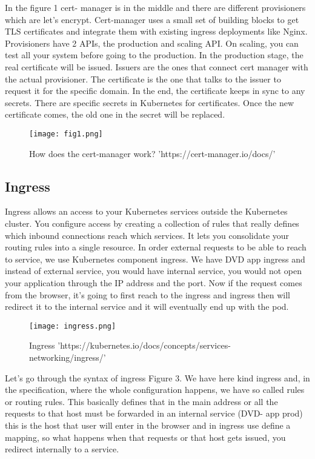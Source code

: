 \documentclass{article}
\begin{document}
In the figure 1  cert- manager is in the middle and there are different provisioners which are let’s encrypt. Cert-manager uses a small set of building blocks to get TLS certificates and integrate them with existing ingress deployments like Nginx. Provisioners have 2 APIs, the production and scaling API. On scaling, you can test all your system before going to the production.  In the production stage, the real certificate will be issued. Issuers are the ones that connect cert manager with the actual provisioner. The certificate is the one that talks to the issuer to request it for the specific domain. In the end, the certificate keeps in sync to any secrets. There are specific secrets in Kubernetes for certificates. Once the new certificate comes, the old one in the secret will be replaced.

\begin{figure}
    \centering
    \texttt{[image: fig1.png]}
    \caption{How does the cert-manager work? 'https://cert-manager.io/docs/'}
    \label{fig:my_label}
\end{figure}


\subsection{Ingress}


Ingress allows an access to your Kubernetes services outside the Kubernetes cluster. You configure access by creating a collection of rules that really defines which inbound connections reach which services. It lets you consolidate your routing rules into a single resource. 
In order external requests to be able to reach to service, we use Kubernetes component ingress.  We have DVD app ingress and instead of external service, you would have internal service, you would not open your application through the IP address and the port.  Now if the request comes from the browser, it’s going to first reach to the ingress and ingress then will redirect it to the internal service and it will eventually end up with the pod. 
\begin{figure}
    \centering
    \texttt{[image: ingress.png]}
    \caption{Ingress 'https://kubernetes.io/docs/concepts/services-networking/ingress/'}
    \label{fig:my_label}
\end{figure}

Let’s go through the syntax of ingress Figure 3. We have here kind ingress and, in the specification, where the whole configuration happens, we have so called rules or routing rules. This basically defines that in the main address or all the requests to that host must be forwarded in an internal service (DVD- app prod) this is the host that user will enter in the browser and in ingress use define a mapping, so what happens when that requests or that host gets issued, you redirect internally to a service. 
\end{document}
